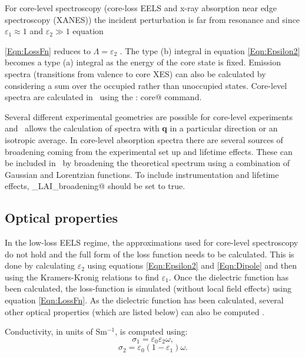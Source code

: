\documentclass[a4paper,11pt,twoside]{book}
\begin{document}
For core-level spectroscopy (core-loss EELS and x-ray absorption near edge spectroscopy (XANES)) the incident perturbation is far from resonance and since $\varepsilon_1\approx1$ and $\varepsilon_2\gg1$ equation\,{\ref{Eqn:LossFn} reduces to  $\Lambda = \varepsilon_2$ \cite{egerton}.
The type (b) integral in equation \ref{Eqn:Epsilon2} becomes a type (a) integral as the energy of the core state is fixed.  Emission spectra (transitions from valence to core XES) can also be calculated by considering a sum over the occupied rather than unoccupied states.  Core-level spectra are calculated in \optados\ using the \verb@task : core@ command.

Several different experimental geometries are possible for core-level experiments and \optados\ allows the calculation of spectra with {\bf q} in a particular direction or an isotropic average.
In core-level absorption spectra there are several sources of broadening coming from the experimental set up and lifetime effects.  These can be included in \optados\ by broadening the theoretical spectrum using a combination of Gaussian and Lorentzian functions.  To include instrumentation and lifetime effects, \verb@core_LAI_broadening@ should be set to true.

\subsection{Optical properties}

In the low-loss EELS regime, the approximations used for core-level spectroscopy do not hold and the full form of the loss function needs to be calculated.  This is done by calculating $\varepsilon_2$ using equations \ref{Eqn:Epsilon2} and \ref{Eqn:Dipole} and then using the Kramers-Kronig relations to find $\varepsilon_1$.  Once the dielectric function has been calculated, the loss-function is simulated (without local field effects) using equation \ref{Eqn:LossFn}. As the dielectric function has been calculated, several other optical properties (which are listed below) can also be computed \cite{dressel}.

Conductivity, in units of Sm$^{-1}$, is computed using:
\begin{equation}
\sigma_1 = \varepsilon_0 \varepsilon_2 \omega,
\end{equation}
\begin{equation}
\sigma_2 = \varepsilon_0 \left ( 1 - \varepsilon_1 \right ) \omega.
\end{equation}

}
\end{document}
